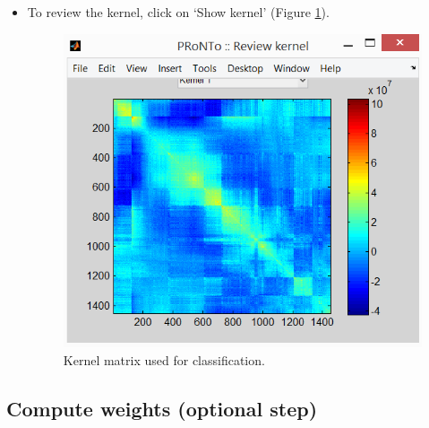 \begin{itemize}
\item To review the kernel, click on `Show kernel' (Figure \ref{fig:reviewKernel}).

\begin{figure}[h!]
	\centering
		\includegraphics[scale=0.7]{images/Tutorial/classification/reviewKernel.png}
	\caption{Kernel matrix used for classification.}
	\label{fig:reviewKernel}
\end{figure}

\end{itemize}


\subsection{Compute weights (optional step)}

